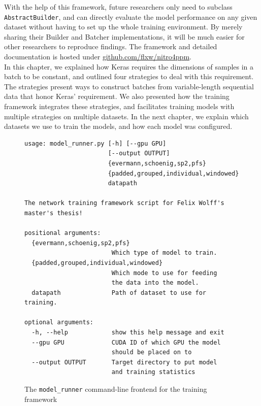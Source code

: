 With the help of this framework, future researchers only need to subclass \verb=AbstractBuilder=, and can directly evaluate the model performance on any given dataset without having to set up the whole training environment. By merely sharing their Builder and Batcher implementations, it will be much easier for other researchers to reproduce findings. The framework and detailed documentation is hosted under \href{https://github.com/flxw/nitro4ppm}{github.com/flxw/nitro4ppm}.\\

In this chapter, we explained how Keras requires the dimensions of samples in a batch to be constant,
and outlined four strategies to deal with this requirement.
The strategies present ways to construct batches from variable-length sequential data that honor Keras' requirement.
We also presented how the training framework integrates these strategies, and
facilitates training models with multiple strategies on multiple datasets.
In the next chapter, we explain which datasets we use to train the models,
and how each model was configured.

\begin{figure}[!htb]
\centering
\begin{verbatim}
usage: model_runner.py [-h] [--gpu GPU]
                       [--output OUTPUT]
                       {evermann,schoenig,sp2,pfs}
                       {padded,grouped,individual,windowed}
                       datapath

The network training framework script for Felix Wolff's master's thesis!

positional arguments:
  {evermann,schoenig,sp2,pfs}
                        Which type of model to train.
  {padded,grouped,individual,windowed}
                        Which mode to use for feeding
                        the data into the model.
  datapath              Path of dataset to use for training.

optional arguments:
  -h, --help            show this help message and exit
  --gpu GPU             CUDA ID of which GPU the model
                        should be placed on to
  --output OUTPUT       Target directory to put model
                        and training statistics
\end{verbatim}
\caption[CLI frontend for the framework]{The \texttt{model\_runner} command-line frontend for the training framework}
\label{fig:framework-frontend}
\end{figure}

